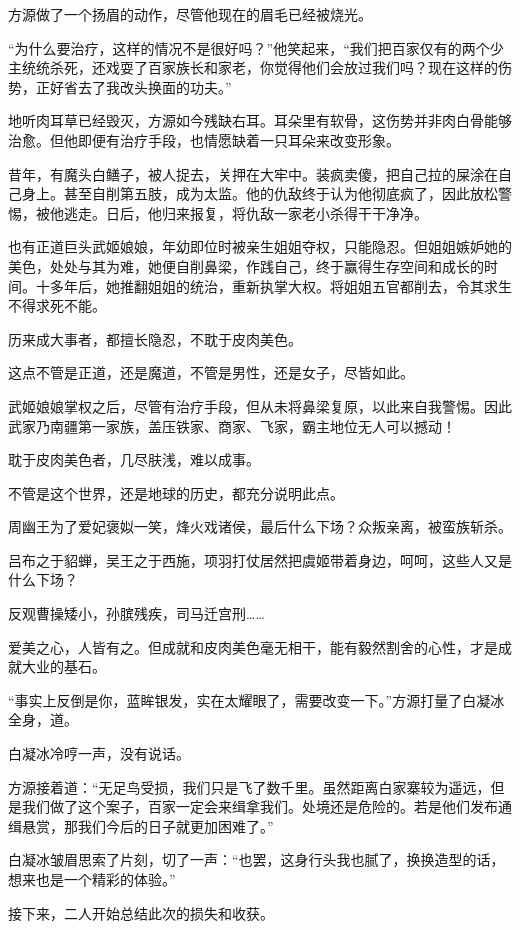 \begin{this_body}
方源做了一个扬眉的动作，尽管他现在的眉毛已经被烧光。

“为什么要治疗，这样的情况不是很好吗？”他笑起来，“我们把百家仅有的两个少主统统杀死，还戏耍了百家族长和家老，你觉得他们会放过我们吗？现在这样的伤势，正好省去了我改头换面的功夫。”

地听肉耳草已经毁灭，方源如今残缺右耳。耳朵里有软骨，这伤势并非肉白骨能够治愈。但他即便有治疗手段，也情愿缺着一只耳朵来改变形象。

昔年，有魔头白鳝子，被人捉去，关押在大牢中。装疯卖傻，把自己拉的屎涂在自己身上。甚至自削第五肢，成为太监。他的仇敌终于认为他彻底疯了，因此放松警惕，被他逃走。日后，他归来报复，将仇敌一家老小杀得干干净净。

也有正道巨头武姬娘娘，年幼即位时被亲生姐姐夺权，只能隐忍。但姐姐嫉妒她的美色，处处与其为难，她便自削鼻梁，作践自己，终于赢得生存空间和成长的时间。十多年后，她推翻姐姐的统治，重新执掌大权。将姐姐五官都削去，令其求生不得求死不能。

历来成大事者，都擅长隐忍，不耽于皮肉美色。

这点不管是正道，还是魔道，不管是男性，还是女子，尽皆如此。

武姬娘娘掌权之后，尽管有治疗手段，但从未将鼻梁复原，以此来自我警惕。因此武家乃南疆第一家族，盖压铁家、商家、飞家，霸主地位无人可以撼动！

耽于皮肉美色者，几尽肤浅，难以成事。

不管是这个世界，还是地球的历史，都充分说明此点。

周幽王为了爱妃褒姒一笑，烽火戏诸侯，最后什么下场？众叛亲离，被蛮族斩杀。

吕布之于貂蝉，吴王之于西施，项羽打仗居然把虞姬带着身边，呵呵，这些人又是什么下场？

反观曹操矮小，孙膑残疾，司马迁宫刑……

爱美之心，人皆有之。但成就和皮肉美色毫无相干，能有毅然割舍的心性，才是成就大业的基石。

“事实上反倒是你，蓝眸银发，实在太耀眼了，需要改变一下。”方源打量了白凝冰全身，道。

白凝冰冷哼一声，没有说话。

方源接着道：“无足鸟受损，我们只是飞了数千里。虽然距离白家寨较为遥远，但是我们做了这个案子，百家一定会来缉拿我们。处境还是危险的。若是他们发布通缉悬赏，那我们今后的日子就更加困难了。”

白凝冰皱眉思索了片刻，切了一声：“也罢，这身行头我也腻了，换换造型的话，想来也是一个精彩的体验。”

接下来，二人开始总结此次的损失和收获。


\end{this_body}
